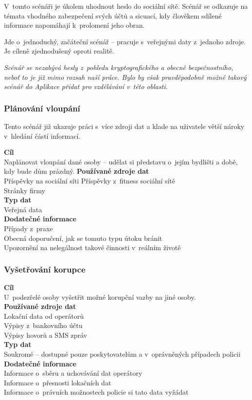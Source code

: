 V~tomto scénáři je úkolem uhodnout heslo do sociální sítě. Scénář se odkazuje na témata vhodného zabezpečení svých účtů a sicuací, kdy člověkem sdílené informace napomáhají k~prolomení jeho obran.

Jde o~jednoduchý, začáteční scénář -- pracuje s~veřejnými daty z~jednoho zdroje. Je cíleně zjednodušený oproti realitě.

\textit{Scénář se nezabývá hesly z~pohledu kryptografického a obecně bezpečnostního, neboť to je již mimo rozsah naší práce. Bylo by však pravděpodobně možné takový scénář do Aplikace přidat pro vzdělávání v~této oblasti.}


\subsubsection*{Plánování vloupání}
Tento scénář již ukazuje práci s~více zdroji dat a klade na uživatele větší nároky v~hledání částí informací.

\textbf{Cíl}\\
Naplánovat vloupání dané osoby -- udělat si představu o~jejím bydlišti a době, kdy bude dům prázdný.
\textbf{Používané zdroje dat}\\
Příspěvky na sociální síti
Příspěvky z~fitness sociální sítě\\
Stránky firmy\\
\textbf{Typ dat}\\
Veřejná data\\
\textbf{Dodatečné informace}\\
Případy z~praxe\\
Obecná doporučení, jak se tomuto typu útoku bránit\\ 
Upozornění na nelegálnost takové činnosti v~reálním životě\\


\subsubsection*{Vyšetřování korupce}

\textbf{Cíl}\\
U~podezřelé osoby vyšetřit možné korupční vazby na jiné osoby.\\
\textbf{Používané zdroje dat}\\
Lokační data od operátorů\\
Výpisy z~bankovního účtu\\
Výpisy hovorů a SMS zpráv\\
\textbf{Typ dat}\\
Soukromé -- dostupné pouze poskytovatelům a v~oprávněných případech policii\\
\textbf{Dodatečné informace}\\
Informace o~sběru a uchovávání dat operátory\\
Informace o~přesnosti lokačních dat\\
Informace o~právních možnostech policie si tato data vyžádat\\


